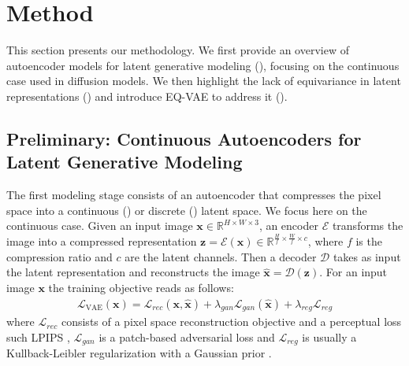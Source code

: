 \section{Method}
\label{sec:equi-vae}


This section presents our methodology. We first provide an overview of autoencoder models for latent generative modeling (), focusing on the continuous case used in diffusion models. We then highlight the lack of equivariance in latent representations () and introduce EQ-VAE to address it ().

\subsection{Preliminary: Continuous Autoencoders for Latent Generative Modeling}
\label{sec:prelim}

The first modeling stage consists of an autoencoder that compresses the pixel space into a continuous (\citet{rombach2022high}) or discrete (\citet{esser2021taming}) latent space. We focus here on the continuous case.
Given an input image $\mathbf{x} \in \mathbb{R}^{H \times W \times 3}$, an 
encoder $\mathcal{E}$ transforms the image into a compressed representation $\mathbf{z}= \mathcal{E(\mathbf{x})} \in \mathbb{R}^{\frac{H}{f} \times \frac{W}{f} \times c}$, where $f$ is the compression ratio and $c$ are the latent channels. Then a decoder $\mathcal{D}$ takes as input the latent representation and reconstructs the image $\hat{\mathbf{x}} = \mathcal{D}(\mathbf{z})$. For an input image $\mathbf{x}$ the training objective reads as follows:
\begin{align}
    \label{eq:ldm}
    \mathcal{L}_{\text{VAE}}(\mathbf{x}) = 
    \mathcal{L}_{rec}(\mathbf{x}, \mathbf{\hat{x}}) + \lambda_{gan} \mathcal{L}_{gan}(\mathbf{\hat{x}}) + 
    \lambda_{reg} \mathcal{L}_{reg}
\end{align}
where $\mathcal{L}_{rec}$ consists of a pixel space reconstruction objective and a perceptual loss such LPIPS \cite{zhang2018unreasonable}, $\mathcal{L}_{gan}$ is a patch-based adversarial loss \cite{isola2017image}
and $\mathcal{L}_{reg}$ is usually a Kullback-Leibler regularization with a Gaussian prior \cite{kingma2014}.





